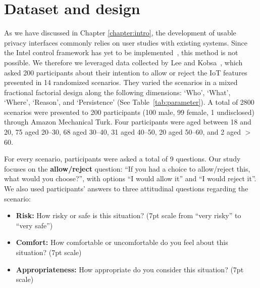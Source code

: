\section{Dataset and design}
As we have discussed in Chapter \ref{chapter:intro}, the development of usable privacy interfaces commonly relies on user studies with existing systems. Since the Intel control framework has yet to be implemented~\cite{chow2015hci}, this method is not possible. We therefore we leveraged data collected by Lee and Kobsa~\cite{lee2016understanding}, which asked 200 participants about their intention to allow or reject the IoT features presented in 14 randomized scenarios. They varied the scenarios in a mixed fractional factorial design along the following dimensions: `Who', `What', `Where', `Reason', and `Persistence' (See Table~\ref{tab:parameter}). A total of 2800 scenarios were presented to 200 participants (100 male, 99 female, 1 undisclosed) through Amazon Mechanical Turk. Four participants were aged between 18 and 20, 75 aged 20--30, 68 aged 30--40, 31 aged 40--50, 20 aged 50--60, and 2 aged $>$ 60.

For every scenario, participants were asked a total of 9 questions. Our study focuses on the \textbf{allow/reject} question: ``If you had a choice to allow/reject this, what would you choose?'', with options ``I would allow it'' and ``I would reject it''. We also used participants' answers to three attitudinal questions regarding the scenario:
\begin{itemize}
	\item \textbf{Risk:} How risky or safe is this situation? (7pt scale from ``very risky'' to ``very safe'')
	\item \textbf{Comfort:} How comfortable or uncomfortable do you feel about this situation? (7pt scale)
	\item \textbf{Appropriateness:} How appropriate do you consider this situation? (7pt scale)
\end{itemize}

